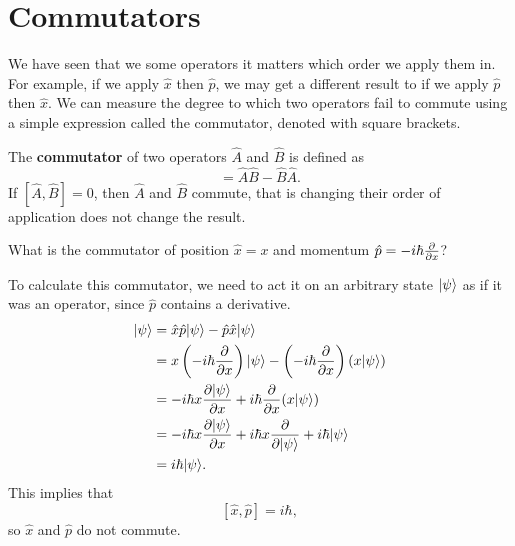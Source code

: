 \documentclass[../quantum_mechanics.tex]{subfiles}
\begin{document}
    \section{Commutators}\label{sec:commutators}
        We have seen that we some operators it matters which order we apply them in.
        For example, if we apply $\hat{x}$ then $\hat{p}$, we may get a different result to if we apply $\hat{p}$ then $\hat{x}$.
        We can measure the degree to which two operators fail to commute using a simple expression called the commutator, denoted with square brackets.
        \begin{definition}
            The \textbf{commutator} of two operators $\hat{A}$ and $\hat{B}$ is defined as
            \begin{equation}
                [\hat{A},\hat{B}]=\hat{A}\hat{B}-\hat{B}\hat{A}.
            \end{equation}
            If $[\hat{A},\hat{B}]=0$, then $\hat{A}$ and $\hat{B}$ commute, that is changing their order of application does not change the result.
        \end{definition}
        \begin{example}\label{ex:commutator-x-p}
            What is the commutator of position $\hat{x}=x$ and momentum $\hat{p}=-i\hbar\pdv{}{x}$?

            To calculate this commutator, we need to act it on an arbitrary state $\lvert\psi\rangle$ as if it was an operator, since $\hat{p}$ contains a derivative.
            \begin{align}
                [\hat{x},\hat{p}]\ket{\psi}&=\hat{x}\hat{p}\ket{\psi}-\hat{p}\hat{x}\ket{\psi}\\
                &=x\left(-i\hbar\pdv{}{x}\right)\ket{\psi}-\left(-i\hbar\pdv{}{x}\right)(x\ket{\psi})\\
                &=-i\hbar x\pdv{\ket{\psi}}{x}+i\hbar\pdv{}{x}(x\ket{\psi})\\
                &=-i\hbar x\pdv{\ket{\psi}}{x}+i\hbar x\pdv{}{\ket{\psi}}+i\hbar\ket{\psi}\\
                &=i\hbar\ket{\psi}.
            \end{align}
            This implies that
            \begin{equation}\label{eq:x-p-commutator}
                [\hat{x},\hat{p}]=i\hbar,
            \end{equation}
            so $\hat{x}$ and $\hat{p}$ do not commute.
        \end{example}
\end{document}
